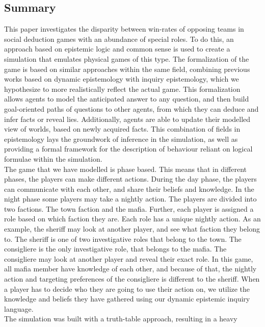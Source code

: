 \onecolumn
\begin{center}
	\section*{Summary}\label{sec:summary}
\end{center}
This paper investigates the disparity between win-rates of opposing teams in
social deduction games with an abundance of special roles. To do  this, an
approach based on epistemic logic and common sense is used to create a
simulation that emulates physical games of this type. The formalization of the
game is based on similar approaches within the same field, combining previous works based on dynamic epistemology with inquiry epistemology,
which we hypothesize to more realistically reflect the actual game. This formalization allows agents to model the anticipated answer to any question, and then build goal-oriented
paths of questions to other agents, from which they can deduce and infer facts or reveal lies. Additionally, agents are able to update their modelled view of worlds, based on newly acquired facts.
This combination of fields in epistemology lays the groundwork of inference in the simulation,
as well as providing a formal framework for the description of behaviour
reliant on logical formulae within the simulation. \\
The game that we have modelled is phase based. This means that in different phases, the players can make different actions. During the day phase, the players can communicate with each other, and share their beliefs and knowledge. In the night phase some players may take a nightly action. The players are divided into two factions. The town faction and the mafia. Further, each player is assigned a role based on which faction they are. Each role has a unique nightly action. As an example, the sheriff may look at another player, and see what faction they belong to. The sheriff is one of two investigative roles that belong to the town. The consigliere is the only investigative role, that belongs to the mafia. The consigliere may look at another player and reveal their exact role. In this game, all mafia member have knowledge of each other, and because of that, the nightly action and targeting preferences of the consigliere is different to the sheriff.
When a player has to decide who they are going to use their action on, we utilize the knowledge and beliefs they have gathered using our dynamic epistemic inquiry language. \\
The simulation was built with a truth-table approach, resulting in a heavy
